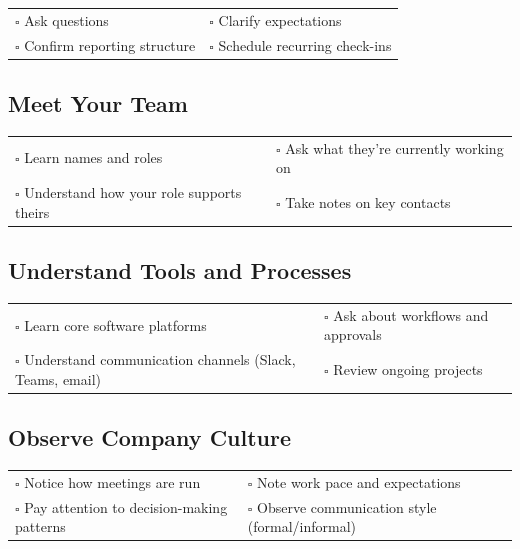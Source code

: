 \begin{tabular}{p{9cm} p{8cm}}
$\square$ Ask questions & $\square$ Clarify expectations \\ 
$\square$ Confirm reporting structure & $\square$ Schedule recurring check-ins \\ 
\end{tabular}

\subsection{Meet Your Team}

\begin{tabular}{p{9cm} p{8cm}}
$\square$ Learn names and roles & $\square$ Ask what they’re currently working on \\ 
$\square$ Understand how your role supports theirs & $\square$ Take notes on key contacts \\ 
\end{tabular}

\subsection{Understand Tools and Processes}

\begin{tabular}{p{9cm} p{8cm}}
$\square$ Learn core software platforms & $\square$ Ask about workflows and approvals \\ 
$\square$ Understand communication channels (Slack, Teams, email) & $\square$ Review ongoing projects \\ 
\end{tabular}

\subsection{Observe Company Culture}

\begin{tabular}{p{9cm} p{8cm}}
$\square$ Notice how meetings are run & $\square$ Note work pace and expectations \\ 
$\square$ Pay attention to decision-making patterns & $\square$ Observe communication style (formal/informal) \\ 
\end{tabular}

